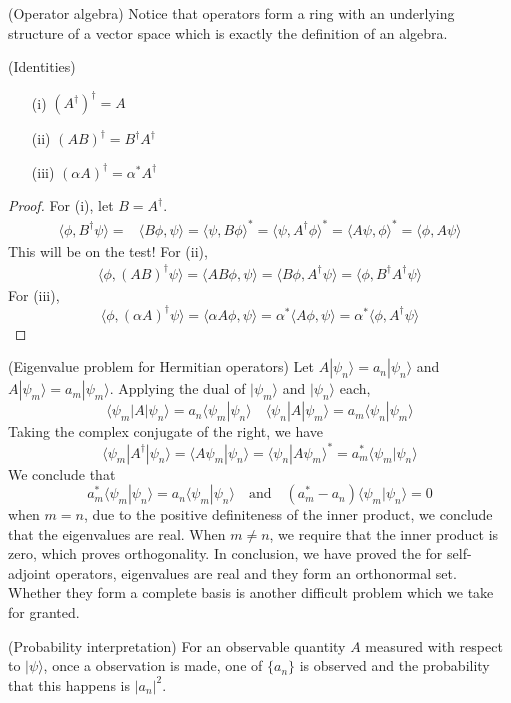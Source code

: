 \vspace{2ex}
\begin{defi}
(Operator algebra) Notice that operators form a ring with an underlying structure of a vector space which is exactly the definition of an algebra. 
\end{defi}
\vspace{2ex}
\begin{rmk}
(Identities)
\begin{itemize}
\item[(i)] $(A^{\dagger})^{\dagger}=A$
\item[(ii)] $(AB)^{\dagger}=B^{\dagger}A^{\dagger}$
\item[(iii)] $(\alpha A)^{\dagger}=\alpha ^{*}A^{\dagger}$
\end{itemize}
\end{rmk}
\vspace{2ex}
\begin{proof}
For (i), let $B=A^{\dagger}$.
\begin{align*}
\langle \phi ,B^{\dagger}\psi \rangle 	=&\langle B\phi ,\psi \rangle =\langle \psi ,B\phi \rangle ^{*}=\langle \psi ,A^{\dagger}\phi \rangle ^{*}=\langle A\psi ,\phi \rangle ^{*}=\langle \phi ,A\psi \rangle 
\end{align*}
This will be on the test! For (ii),
\begin{align*}
\langle \phi ,(AB)^{\dagger}\psi \rangle =\langle AB\phi ,\psi \rangle =\langle B\phi ,A^{\dagger}\psi \rangle =\langle \phi ,B^{\dagger}A^{\dagger}\psi \rangle 
\end{align*}
For (iii),
\[\langle \phi ,(\alpha A)^{\dagger}\psi \rangle =\langle \alpha A\phi ,\psi \rangle =\alpha ^{*}\langle A\phi ,\psi \rangle =\alpha ^{*}\langle \phi ,A^{\dagger}\psi \rangle \]
\end{proof}
\vspace{2ex}
\begin{thm}
(Eigenvalue problem for Hermitian operators) Let $A|\psi _{n}\rangle =a_{n}|\psi _{n}\rangle $ and $A|\psi _{m}\rangle =a_{m}|\psi _{m}\rangle $. Applying the dual of $|\psi _{m}\rangle $ and $|\psi _{n}\rangle $ each, 
\[\langle \psi _{m}|A|\psi _{n}\rangle =a_{n}\langle \psi _{m}|\psi _{n}\rangle \quad \langle \psi _{n}|A|\psi _{m}\rangle =a_{m}\langle \psi _{n}|\psi _{m}\rangle \]
Taking the complex conjugate of the right, we have
\[\langle \psi _{m}|A^{\dagger}|\psi _{n}\rangle =\langle A\psi _{m}|\psi _{n}\rangle =\langle \psi _{n}|A\psi _{m}\rangle ^{*}=a_{m}^{*}\langle \psi _{m}|\psi _{n}\rangle \]
We conclude that 
\[a_{m}^{*}\langle \psi _{m}|\psi _{n}\rangle =a_{n}\langle \psi _{m}|\psi _{n}\rangle \quad \mathrm{and}\quad (a^{*}_{m}-a_{n})\langle \psi _{m}|\psi _{n}\rangle =0\]
when $m=n$, due to the positive definiteness of the inner product, we conclude that the eigenvalues are real. When $m\ne n$, we require that the inner product is zero, which proves orthogonality. In conclusion, we have proved the for self-adjoint operators, eigenvalues are real and they form an orthonormal set. Whether they form a complete basis is another difficult problem which we take for granted.
\end{thm}
\vspace{2ex}
\begin{prop}
(Probability interpretation) For an observable quantity $A$ measured with respect to $|\psi \rangle $, once a observation is made, one of $\{a_{n}\}$ is observed and the probability that this happens is $|a_{n}|^2$.
\end{prop}
\vspace{2ex}

